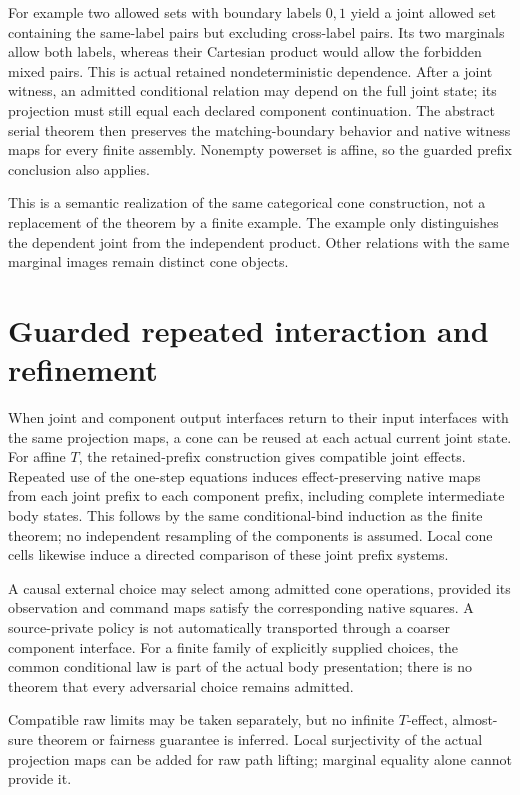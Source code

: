 \documentclass[11pt]{article}
\begin{document}
For example two allowed sets with boundary labels $0,1$ yield a joint allowed set containing the same-label pairs but excluding cross-label pairs. Its two marginals allow both labels, whereas their Cartesian product would allow the forbidden mixed pairs. This is actual retained nondeterministic dependence. After a joint witness, an admitted conditional relation may depend on the full joint state; its projection must still equal each declared component continuation. The abstract serial theorem then preserves the matching-boundary behavior and native witness maps for every finite assembly. Nonempty powerset is affine, so the guarded prefix conclusion also applies.

This is a semantic realization of the same categorical cone construction, not a replacement of the theorem by a finite example. The example only distinguishes the dependent joint from the independent product. Other relations with the same marginal images remain distinct cone objects.

\section{Guarded repeated interaction and refinement}
When joint and component output interfaces return to their input interfaces with the same projection maps, a cone can be reused at each actual current joint state. For affine $T$, the retained-prefix construction gives compatible joint effects. Repeated use of the one-step equations induces effect-preserving native maps from each joint prefix to each component prefix, including complete intermediate body states. This follows by the same conditional-bind induction as the finite theorem; no independent resampling of the components is assumed. Local cone cells likewise induce a directed comparison of these joint prefix systems.

A causal external choice may select among admitted cone operations, provided its observation and command maps satisfy the corresponding native squares. A source-private policy is not automatically transported through a coarser component interface. For a finite family of explicitly supplied choices, the common conditional law is part of the actual body presentation; there is no theorem that every adversarial choice remains admitted.

Compatible raw limits may be taken separately, but no infinite $T$-effect, almost-sure theorem or fairness guarantee is inferred. Local surjectivity of the actual projection maps can be added for raw path lifting; marginal equality alone cannot provide it.
\end{document}
